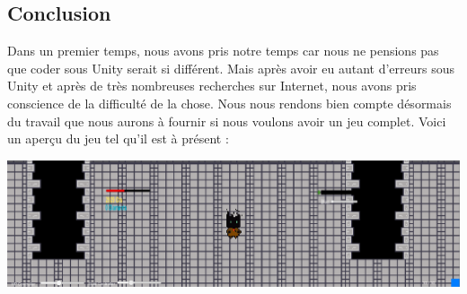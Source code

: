 \documentclass[]{extarticle}
\begin{document}
\begin{spacing}{1.25}
\section{Conclusion}
\bigbreak
\bigbreak
Dans un premier temps, nous avons pris notre temps car nous ne pensions pas que coder sous Unity serait si différent. Mais après avoir eu autant d'erreurs sous Unity et après de très nombreuses recherches sur Internet, nous avons pris conscience de la difficulté de la chose. Nous nous rendons bien compte désormais du travail que nous aurons à fournir si nous voulons avoir un jeu complet. Voici un aperçu du jeu tel qu'il est à présent :
\bigbreak
\begin{center}
\includegraphics[scale = 0.35]{affichagejeu.PNG}
\end{center}
\end{spacing}
\newpage
\end{document}
